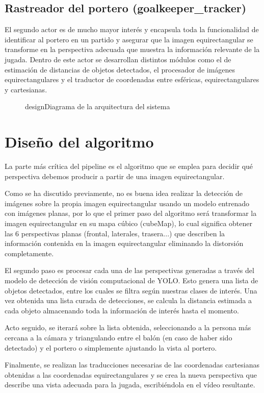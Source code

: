 \subsection{Rastreador del portero (goalkeeper\_tracker)}
El segundo actor es de mucho mayor interés y encapsula toda la funcionalidad de identificar al portero en un partido y asegurar que la imagen equirectangular se transforme en la perspectiva adecuada que muestra la información relevante de la jugada. Dentro de este actor se desarrollan distintos módulos como el de estimación de distancias de objetos detectados, el procesador de imágenes equirectangulares y el traductor de coordenadas entre esféricas, equirectangulares y cartesianas.


\begin{figure}[Arquitectura del sistema]{design}{Diagrama de la arquitectura del sistema}
	\begin{center}
	\end{center}
\end{figure}

\section{Diseño del algoritmo}
La parte más crítica del pipeline es el algoritmo que se emplea para decidir qué perspectiva debemos producir a partir de una imagen equirectangular.

Como se ha discutido previamente, no es buena idea realizar la detección de imágenes sobre la propia imagen equirectangular usando un modelo entrenado con imágenes planas, por lo que el primer paso del algoritmo será transformar la imagen equirectangular en su mapa cúbico (cubeMap), lo cual significa obtener las 6 perspectivas planas (frontal, laterales, trasera...) que describen la información contenida en la imagen equirectangular eliminando la distorsión completamente.

El segundo paso es procesar cada una de las perspectivas generadas a través del modelo de detección de visión computacional de YOLO. Esto genera una lista de objetos detectados, entre los cuales se filtra según nuestras clases de interés. Una vez obtenida una lista curada de detecciones, se calcula la distancia estimada a cada objeto almacenando toda la información de interés hasta el momento.

Acto seguido, se iterará sobre la lista obtenida, seleccionando a la persona más cercana a la cámara y triangulando entre el balón (en caso de haber sido detectado) y el portero o simplemente ajustando la vista al portero.

Finalmente, se realizan las traducciones necesarias de las coordenadas cartesianas obtenidas a las coordenadas equirectangulares y se crea la nueva perspectiva que describe una vista adecuada para la jugada, escribiéndola en el vídeo resultante.
